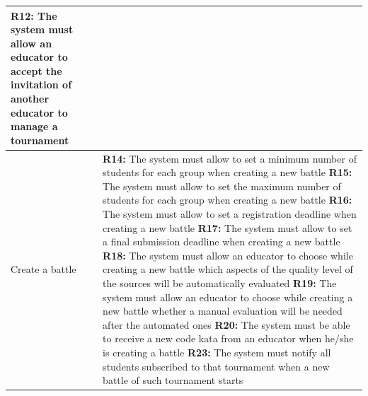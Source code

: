 \documentclass[../RASD.tex]{subfiles}
\begin{document}
\begin{table}[h!]
\begin{center}
\begin{tabular}{|m{10em}|m{30em}|}
            \textbf{R12:} The system must allow an educator to accept the invitation of another educator to manage a tournament\cellcolor{UCMappingSecondColumn}\\
            \hline
            Create a battle \cellcolor{UCMappingFirstColumn}& \textbf{R14:} The system must allow to set a minimum number of students for each group when creating a new battle\cellcolor{UCMappingSecondColumn}\newline
            \textbf{R15:} The system must allow to set the maximum number of students for each group when creating a new battle\cellcolor{UCMappingSecondColumn}\newline
            \textbf{R16:} The system must allow to set a registration deadline when creating a new battle\cellcolor{UCMappingSecondColumn}\newline
            \textbf{R17:} The system must allow to set a final submission deadline when creating a new
            battle\cellcolor{UCMappingSecondColumn}\newline
            \textbf{R18:} The system must allow an educator to choose while creating a new battle which
            aspects of the quality level of the sources will be automatically evaluated\cellcolor{UCMappingSecondColumn}\newline
            \textbf{R19:} The system must allow an educator to choose while creating a new battle whether a manual evaluation will be needed after the automated ones\cellcolor{UCMappingSecondColumn}\newline
            \textbf{R20:} The system must be able to receive a new code kata from an educator when he/she is creating a battle\cellcolor{UCMappingSecondColumn}\newline
            \textbf{R23:} The system must notify all students subscribed to that tournament when a new battle of such tournament starts\cellcolor{UCMappingSecondColumn}\\
            \hline
            \end{tabular}
        \end{center}
    \end{table}
    \newpage
    \restoregeometry
\end{document}
